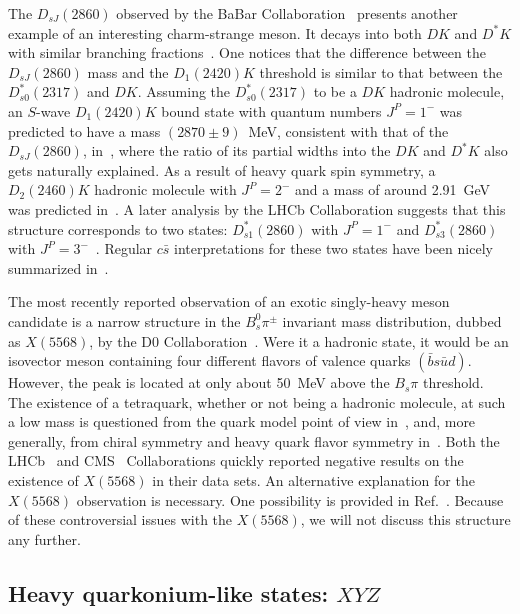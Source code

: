 The $D_{sJ}(2860)$ observed by the BaBar Collaboration~\cite{Aubert:2006mh} 
presents another example of an interesting charm-strange meson. It decays into 
both $DK$ and $D^*K$ with similar branching fractions~\cite{Olive:2016xmw}.  
One notices that the difference between the $D_{sJ}(2860)$ mass and the 
$D_1(2420)K$ threshold is similar to that between the $D_{s0}^*(2317)$ and 
$DK$. Assuming the $D_{s0}^*(2317)$ to be a $DK$ hadronic molecule, an $S$-wave 
$D_1(2420)K$ bound state with quantum numbers $J^P=1^-$ was predicted to have a 
mass $(2870\pm9)$~MeV, consistent with that of the $D_{sJ}(2860)$, 
in~\cite{Guo:2011dd}, where the ratio of its partial widths into the $DK$ and 
$D^*K$ also gets naturally explained. As a result of heavy quark spin symmetry, 
a $D_2(2460)K$ hadronic molecule with $J^P=2^-$ and a mass of around 2.91~GeV 
was predicted in~\cite{Guo:2011dd}.  A later analysis by the LHCb Collaboration 
suggests that this structure corresponds to two states: $D_{s1}^*(2860)$ with 
$J^P=1^-$ and $D_{s3}^*(2860)$ with $J^P=3^-$~\cite{Aaij:2014xza}. Regular 
$c\bar s$ interpretations for these two states have been nicely summarized 
in~\cite{Chen:2016spr}.

The most recently reported observation of an exotic singly-heavy meson candidate
is a narrow structure in the $B_s^0\pi^\pm$ invariant mass distribution, dubbed
as $X(5568)$, by the D0 Collaboration~\cite{D0:2016mwd}.
Were it a hadronic state, it would be an {isovector} meson containing four
different flavors of valence quarks $(\bar b s\bar u d)$. However, the peak is
located at only about 50~MeV above the $B_s\pi$ threshold. The existence of a
tetraquark, whether or not being a hadronic molecule, at such a low mass is
questioned from the quark model point of view in~\cite{Burns:2016gvy}, and, more
generally, from chiral symmetry and heavy quark flavor symmetry
in~\cite{Guo:2016nhb}. Both the LHCb~\cite{Aaij:2016iev} and
CMS~\cite{CMS:2016fvl} Collaborations quickly reported negative results on the
existence of $X(5568)$ in their data sets.
An alternative explanation for the $X(5568)$ observation is necessary. One
possibility is provided in Ref.~\cite{Yang:2016sws}. Because of these
controversial issues with the $X(5568)$, we will not discuss this structure any
further.


\subsection{Heavy quarkonium-like states: {$XYZ$}}

